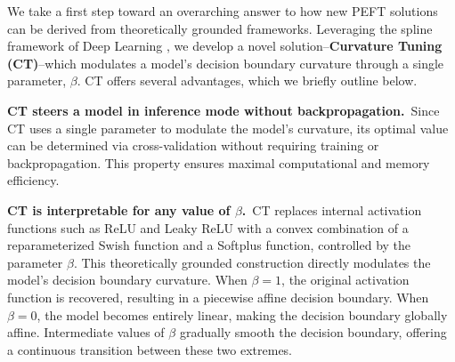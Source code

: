 We take a first step toward an overarching answer to how new PEFT solutions can be derived from theoretically grounded frameworks. Leveraging the spline framework of Deep Learning \cite{montufar2014numoflinreg, balestriero2018spline}, we develop a novel solution--\textbf{Curvature Tuning (CT)}--which modulates a model’s decision boundary curvature through a single parameter, $\beta$. CT offers several advantages, which we briefly outline below.

{\bf CT steers a model in inference mode without backpropagation.}~Since CT uses a single parameter to modulate the model's curvature, its optimal value can be determined via cross-validation without requiring training or backpropagation. This property ensures maximal computational and memory efficiency.

{\bf CT is interpretable for any value of $\beta$.}~CT replaces internal activation functions such as ReLU and Leaky ReLU with a convex combination of a reparameterized Swish function \cite{ramachandran2017swish} and a Softplus function, controlled by the parameter $\beta$. This theoretically grounded construction directly modulates the model’s decision boundary curvature. When $\beta = 1$, the original activation function is recovered, resulting in a piecewise affine decision boundary. When $\beta = 0$, the model becomes entirely linear, making the decision boundary globally affine. Intermediate values of $\beta$ gradually smooth the decision boundary, offering a continuous transition between these two extremes.




